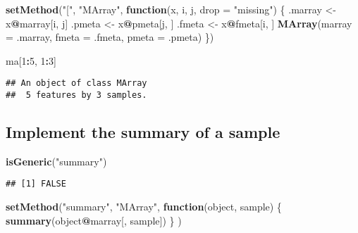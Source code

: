 \documentclass[]{article}
\newenvironment{Shaded}{\begin{snugshade}}{\end{snugshade}}
\newcommand{\ControlFlowTok}[1]{\textcolor[rgb]{0.13,0.29,0.53}{\textbf{#1}}}
\newcommand{\DataTypeTok}[1]{\textcolor[rgb]{0.13,0.29,0.53}{#1}}
\newcommand{\DecValTok}[1]{\textcolor[rgb]{0.00,0.00,0.81}{#1}}
\newcommand{\KeywordTok}[1]{\textcolor[rgb]{0.13,0.29,0.53}{\textbf{#1}}}
\newcommand{\NormalTok}[1]{#1}
\newcommand{\OperatorTok}[1]{\textcolor[rgb]{0.81,0.36,0.00}{\textbf{#1}}}
\newcommand{\StringTok}[1]{\textcolor[rgb]{0.31,0.60,0.02}{#1}}
\begin{document}
\begin{Shaded}
\begin{Highlighting}[]
\KeywordTok{setMethod}\NormalTok{(}\StringTok{"["}\NormalTok{, }\StringTok{"MArray"}\NormalTok{, }
          \ControlFlowTok{function}\NormalTok{(x, i, j, }\DataTypeTok{drop =} \StringTok{"missing"}\NormalTok{) \{ }
\NormalTok{              .marray <-}\StringTok{ }\NormalTok{x}\OperatorTok{@}\NormalTok{marray[i, j] }
\NormalTok{              .pmeta <-}\StringTok{ }\NormalTok{x}\OperatorTok{@}\NormalTok{pmeta[j, ] }
\NormalTok{              .fmeta <-}\StringTok{ }\NormalTok{x}\OperatorTok{@}\NormalTok{fmeta[i, ]}
                \KeywordTok{MArray}\NormalTok{(}\DataTypeTok{marray =}\NormalTok{ .marray,}
                        \DataTypeTok{fmeta =}\NormalTok{ .fmeta,}
                        \DataTypeTok{pmeta =}\NormalTok{ .pmeta)}
\NormalTok{\})}
\end{Highlighting}
\end{Shaded}

\begin{Shaded}
\begin{Highlighting}[]
\NormalTok{ma[}\DecValTok{1}\OperatorTok{:}\DecValTok{5}\NormalTok{, }\DecValTok{1}\OperatorTok{:}\DecValTok{3}\NormalTok{]}
\end{Highlighting}
\end{Shaded}

\begin{verbatim}
## An object of class MArray
##  5 features by 3 samples.
\end{verbatim}

\hypertarget{implement-the-summary-of-a-sample}{%
\subsection{Implement the summary of a
sample}\label{implement-the-summary-of-a-sample}}

\begin{Shaded}
\begin{Highlighting}[]
\KeywordTok{isGeneric}\NormalTok{(}\StringTok{"summary"}\NormalTok{)}
\end{Highlighting}
\end{Shaded}

\begin{verbatim}
## [1] FALSE
\end{verbatim}

\begin{Shaded}
\begin{Highlighting}[]
\KeywordTok{setMethod}\NormalTok{(}\StringTok{"summary"}\NormalTok{, }\StringTok{"MArray"}\NormalTok{, }
          \ControlFlowTok{function}\NormalTok{(object, sample) \{}
              \KeywordTok{summary}\NormalTok{(object}\OperatorTok{@}\NormalTok{marray[, sample])}
\NormalTok{          \}          )}
\end{Highlighting}
\end{Shaded}
\end{document}
